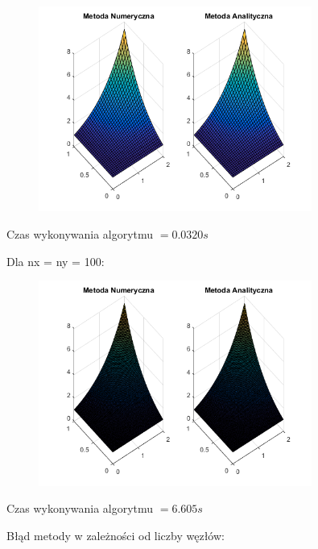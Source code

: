 \begin{figure}[!ht]
	\begin{center}
		\includegraphics[width=0.8\textwidth]{Lab5/charts/zad2/30x30.png}
	\end{center}
\end{figure}

Czas wykonywania algorytmu $ = 0.0320 s$

Dla nx = ny = 100:

\begin{figure}[!ht]
	\begin{center}
		\includegraphics[width=0.8\textwidth]{Lab5/charts/zad2/100x100.png}
	\end{center}
\end{figure}

Czas wykonywania algorytmu $ = 6.605 s$

\newpage

Błąd metody w zależności od liczby węzłów:


